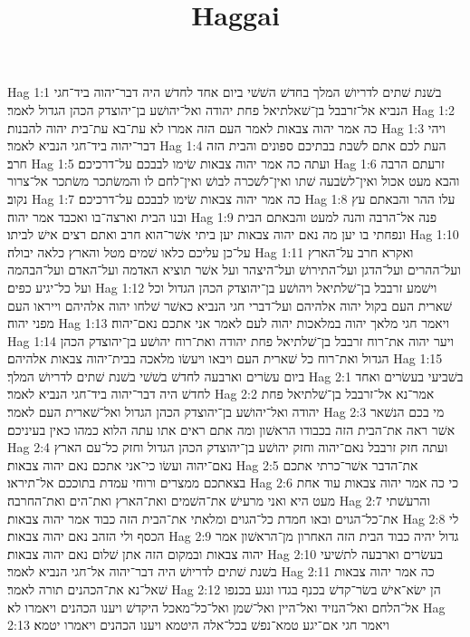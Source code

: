 

\title{Haggai}

Hag 1:1  בשׁנת שׁתים לדריושׁ המלך בחדשׁ השׁשׁי ביום אחד לחדשׁ היה דבר־יהוה ביד־חגי הנביא אל־זרבבל בן־שׁאלתיאל פחת יהודה ואל־יהושׁע בן־יהוצדק הכהן הגדול לאמר׃
Hag 1:2  כה אמר יהוה צבאות לאמר העם הזה אמרו לא עת־בא עת־בית יהוה להבנות׃
Hag 1:3  ויהי דבר־יהוה ביד־חגי הנביא לאמר׃
Hag 1:4  העת לכם אתם לשׁבת בבתיכם ספונים והבית הזה חרב׃
Hag 1:5  ועתה כה אמר יהוה צבאות שׂימו לבבכם על־דרכיכם׃
Hag 1:6  זרעתם הרבה והבא מעט אכול ואין־לשׂבעה שׁתו ואין־לשׁכרה לבושׁ ואין־לחם לו והמשׂתכר משׂתכר אל־צרור נקוב׃
Hag 1:7  כה אמר יהוה צבאות שׂימו לבבכם על־דרכיכם׃
Hag 1:8  עלו ההר והבאתם עץ ובנו הבית וארצה־בו ואכבד אמר יהוה׃
Hag 1:9  פנה אל־הרבה והנה למעט והבאתם הבית ונפחתי בו יען מה נאם יהוה צבאות יען ביתי אשׁר־הוא חרב ואתם רצים אישׁ לביתו׃
Hag 1:10  על־כן עליכם כלאו שׁמים מטל והארץ כלאה יבולה׃
Hag 1:11  ואקרא חרב על־הארץ ועל־ההרים ועל־הדגן ועל־התירושׁ ועל־היצהר ועל אשׁר תוציא האדמה ועל־האדם ועל־הבהמה ועל כל־יגיע כפים׃
Hag 1:12  וישׁמע זרבבל בן־שׁלתיאל ויהושׁע בן־יהוצדק הכהן הגדול וכל שׁארית העם בקול יהוה אלהיהם ועל־דברי חגי הנביא כאשׁר שׁלחו יהוה אלהיהם וייראו העם מפני יהוה׃
Hag 1:13  ויאמר חגי מלאך יהוה במלאכות יהוה לעם לאמר אני אתכם נאם־יהוה׃
Hag 1:14  ויער יהוה את־רוח זרבבל בן־שׁלתיאל פחת יהודה ואת־רוח יהושׁע בן־יהוצדק הכהן הגדול ואת־רוח כל שׁארית העם ויבאו ויעשׂו מלאכה בבית־יהוה צבאות אלהיהם׃
Hag 1:15  ביום עשׂרים וארבעה לחדשׁ בשׁשׁי בשׁנת שׁתים לדריושׁ המלך׃
Hag 2:1  בשׁביעי בעשׂרים ואחד לחדשׁ היה דבר־יהוה ביד־חגי הנביא לאמר׃
Hag 2:2  אמר־נא אל־זרבבל בן־שׁלתיאל פחת יהודה ואל־יהושׁע בן־יהוצדק הכהן הגדול ואל־שׁארית העם לאמר׃
Hag 2:3  מי בכם הנשׁאר אשׁר ראה את־הבית הזה בכבודו הראשׁון ומה אתם ראים אתו עתה הלוא כמהו כאין בעיניכם׃
Hag 2:4  ועתה חזק זרבבל נאם־יהוה וחזק יהושׁע בן־יהוצדק הכהן הגדול וחזק כל־עם הארץ נאם־יהוה ועשׂו כי־אני אתכם נאם יהוה צבאות׃
Hag 2:5  את־הדבר אשׁר־כרתי אתכם בצאתכם ממצרים ורוחי עמדת בתוככם אל־תיראו׃
Hag 2:6  כי כה אמר יהוה צבאות עוד אחת מעט היא ואני מרעישׁ את־השׁמים ואת־הארץ ואת־הים ואת־החרבה׃
Hag 2:7  והרעשׁתי את־כל־הגוים ובאו חמדת כל־הגוים ומלאתי את־הבית הזה כבוד אמר יהוה צבאות׃
Hag 2:8  לי הכסף ולי הזהב נאם יהוה צבאות׃
Hag 2:9  גדול יהיה כבוד הבית הזה האחרון מן־הראשׁון אמר יהוה צבאות ובמקום הזה אתן שׁלום נאם יהוה צבאות׃
Hag 2:10  בעשׂרים וארבעה לתשׁיעי בשׁנת שׁתים לדריושׁ היה דבר־יהוה אל־חגי הנביא לאמר׃
Hag 2:11  כה אמר יהוה צבאות שׁאל־נא את־הכהנים תורה לאמר׃
Hag 2:12  הן ישׂא־אישׁ בשׂר־קדשׁ בכנף בגדו ונגע בכנפו אל־הלחם ואל־הנזיד ואל־היין ואל־שׁמן ואל־כל־מאכל היקדשׁ ויענו הכהנים ויאמרו לא׃
Hag 2:13  ויאמר חגי אם־יגע טמא־נפשׁ בכל־אלה היטמא ויענו הכהנים ויאמרו יטמא׃
